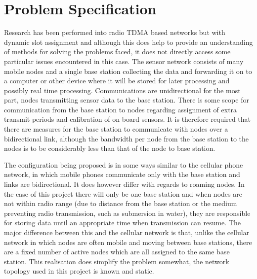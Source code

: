 \documentclass[parskip]{cs4rep}
\begin{document}
\section{Problem Specification}

Research has been performed into radio TDMA based networks but with dynamic slot assignment \cite{PR3} and although this does help to provide an understanding of methods for solving the problems faced, it does not directly access some particular issues encountered in this case. The sensor network consists of many mobile nodes and a single base station collecting the data and forwarding it on to a computer or other device where it will be stored for later processing and possibly real time processing. Communications are unidirectional for the most part, nodes transmitting sensor data to the base station. There is some scope for communication from the base station to nodes regarding assignment of extra transmit periods and calibration of on board sensors. It is therefore required that there are measures for the base station to communicate with nodes over a bidirectional link, although the bandwidth per node from the base station to the nodes is to be considerably less than that of the node to base station.

The configuration being proposed is in some ways similar to the cellular phone network, in which mobile phones communicate only with the base station and links are bidirectional. It does however differ with regards to roaming nodes. In the case of this project there will only be one base station and when nodes are not within radio range (due to distance from the base station or the medium preventing radio transmission, such as submersion in water), they are responsible for storing data until an appropriate time when transmission can resume. The major difference between this and the cellular network is that, unlike the cellular network in which nodes are often mobile and moving between base stations, there are a fixed number of active nodes which are all assigned to the same base station. This realisation does simplify the problem somewhat, the network topology used in this project is known and static.
\end{document}

